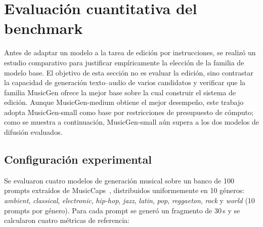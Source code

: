 %

\section{Evaluación cuantitativa del benchmark}
\label{sec:benchmark}

Antes de adaptar un modelo a la tarea de edición por instrucciones, se realizó
un estudio comparativo para justificar empíricamente la elección de la familia de
modelo base. El objetivo de esta sección no es evaluar la edición, sino contrastar
la capacidad de generación texto--audio de varios candidatos y verificar que la
familia MusicGen ofrece la mejor base sobre la cual construir el sistema de
edición. Aunque MusicGen-medium obtiene el mejor desempeño, este trabajo adopta
MusicGen-small como base por restricciones de presupuesto de cómputo; como se
muestra a continuación, MusicGen-small aún supera a los dos modelos de difusión
evaluados.

\subsection{Configuración experimental}
\label{sec:benchmark:setup}

Se evaluaron cuatro modelos de generación musical sobre un banco de 100 prompts
extraídos de MusicCaps~\cite{musiccaps}, distribuidos uniformemente en 10 géneros:
\textit{ambient}, \textit{classical}, \textit{electronic}, \textit{hip-hop},
\textit{jazz}, \textit{latin}, \textit{pop}, \textit{reggaeton}, \textit{rock} y
\textit{world} (10 prompts por género). Para cada prompt se generó un fragmento de
30\,s y se calcularon cuatro métricas de referencia:

